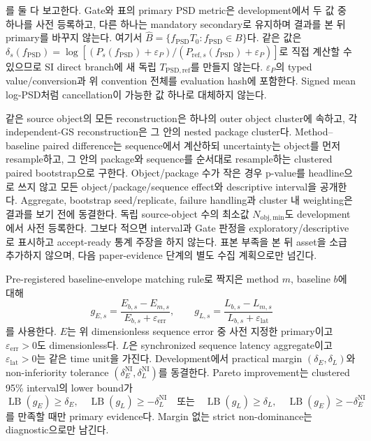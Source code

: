 \documentclass[11pt]{article}
\begin{document}
를 둘 다 보고한다. Gate와 표의 primary PSD metric은 development에서 두 값 중 하나를 사전 등록하고,
다른 하나는 mandatory secondary로 유지하며 결과를 본 뒤 primary를 바꾸지 않는다.
여기서 \(\widehat B=\{f_{\mathrm{PSD}}T_0:f_{\mathrm{PSD}}\in B\}\)다. 같은 값은
\(\delta_s(f_{\mathrm{PSD}})=
\log[(P_s(f_{\mathrm{PSD}})+\varepsilon_P)/
(P_{\mathrm{ref},s}(f_{\mathrm{PSD}})+\varepsilon_P)]\)로 직접
계산할 수 있으므로 SI direct branch에 새 독립 \(T_{\mathrm{PSD,ref}}\)를 만들지 않는다.
\(\varepsilon_P\)의 typed value/conversion과 위 convention 전체를 evaluation hash에 포함한다.
Signed mean log-PSD처럼 cancellation이 가능한 값 하나로 대체하지 않는다.

같은 source object의 모든 reconstruction은 하나의 outer object cluster에 속하고,
각 independent-GS reconstruction은 그 안의 nested package cluster다. Method--baseline paired difference는
sequence에서 계산하되 uncertainty는 object를 먼저 resample하고, 그 안의 package와 sequence를
순서대로 resample하는 clustered paired bootstrap으로 구한다. Object/package 수가 작은 경우 p-value를
headline으로 쓰지 않고 모든 object/package/sequence effect와 descriptive interval을 공개한다.
Aggregate, bootstrap seed/replicate, failure handling과 cluster 내 weighting은 결과를 보기 전에 동결한다.
독립 source-object 수의 최소값 \(N_{\mathrm{obj,min}}\)도 development에서 사전 등록한다.
그보다 적으면 interval과 Gate 판정을 exploratory/descriptive로 표시하고 accept-ready 통계 주장을 하지 않는다.
표본 부족을 본 뒤 asset을 소급 추가하지 않으며, 다음 paper-evidence 단계의 별도 수집 계획으로만 넘긴다.

Pre-registered baseline-envelope matching rule로 짝지은 method \(m\), baseline \(b\)에 대해
\begin{equation}
  g_{E,s}=\frac{E_{b,s}-E_{m,s}}{E_{b,s}+\varepsilon_{\mathrm{err}}},\qquad
  g_{L,s}=\frac{L_{b,s}-L_{m,s}}{L_{b,s}+\varepsilon_{\mathrm{lat}}}
  \label{eq:minimal-pareto-effects}
\end{equation}
를 사용한다. \(E\)는 위 dimensionless sequence error 중 사전 지정한 primary이고
\(\varepsilon_{\mathrm{err}}>0\)도 dimensionless다. \(L\)은 synchronized sequence latency aggregate이고
\(\varepsilon_{\mathrm{lat}}>0\)는 같은 time unit을 가진다.
Development에서 practical margin \((\delta_E,\delta_L)\)와 non-inferiority tolerance
\((\delta_E^{\mathrm{NI}},\delta_L^{\mathrm{NI}})\)를 동결한다. Pareto improvement는 clustered 95\% interval의
lower bound가
\[
  \operatorname{LB}(g_E)\geq\delta_E,\quad
  \operatorname{LB}(g_L)\geq-\delta_L^{\mathrm{NI}}
  \quad\text{또는}\quad
  \operatorname{LB}(g_L)\geq\delta_L,\quad
  \operatorname{LB}(g_E)\geq-\delta_E^{\mathrm{NI}}
\]
를 만족할 때만 primary evidence다. Margin 없는 strict non-dominance는 diagnostic으로만 남긴다.
\end{document}
